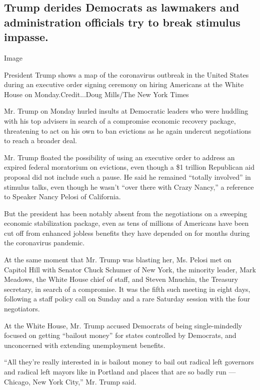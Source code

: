 \hypertarget{trump-derides-democrats-as-lawmakers-and-administration-officials-try-to-break-stimulus-impasse}{%
\subsection{Trump derides Democrats as lawmakers and administration
officials try to break stimulus
impasse.}\label{trump-derides-democrats-as-lawmakers-and-administration-officials-try-to-break-stimulus-impasse}}

Image

President Trump shows a map of the coronavirus outbreak in the United
States during an executive order signing ceremony on hiring Americans at
the White House on Monday.Credit...Doug Mills/The New York Times

Mr. Trump on Monday hurled insults at Democratic leaders who were
huddling with his top advisers in search of a compromise economic
recovery package, threatening to act on his own to ban evictions as he
again undercut negotiations to reach a broader deal.

Mr. Trump floated the possibility of using an executive order to address
an expired federal moratorium on evictions, even though a \$1 trillion
Republican aid proposal did not include such a pause. He said he
remained ``totally involved'' in stimulus talks, even though he wasn't
``over there with Crazy Nancy,'' a reference to Speaker Nancy Pelosi of
California.

But the president has been notably absent from the negotiations on a
sweeping economic stabilization package, even as tens of millions of
Americans have been cut off from enhanced jobless benefits they have
depended on for months during the coronavirus pandemic.

At the same moment that Mr. Trump was blasting her, Ms. Pelosi met on
Capitol Hill with Senator Chuck Schumer of New York, the minority
leader, Mark Meadows, the White House chief of staff, and Steven
Mnuchin, the Treasury secretary, in search of a compromise. It was the
fifth such meeting in eight days, following a staff policy call on
Sunday and a rare Saturday session with the four negotiators.

At the White House, Mr. Trump accused Democrats of being single-mindedly
focused on getting ``bailout money'' for states controlled by Democrats,
and unconcerned with extending unemployment benefits.

``All they're really interested in is bailout money to bail out radical
left governors and radical left mayors like in Portland and places that
are so badly run --- Chicago, New York City,'' Mr. Trump said.

